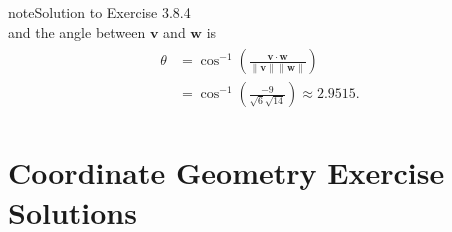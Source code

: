 \documentclass[letterpaper,10pt,english]{jupyterBook}
\begin{document}
\begin{sphinxadmonition}{note}{Solution to Exercise 3.8.4}
\begin{equation*}
\end{equation*}
\sphinxAtStartPar
and the angle between \(\mathbf{v}\) and \(\mathbf{w}\) is
\begin{equation*}
\begin{split} \begin{align*}
    \theta &= \cos^{-1} \left( \frac{\mathbf{v} \cdot \mathbf{w}}{\|\mathbf{v} \|\|\mathbf{w}\|} \right) \\
    &= \cos^{-1} \left( \frac{-9}{\sqrt{6}\sqrt{14}} \right) \approx 2.9515.
\end{align*} \end{split}
\end{equation*}\end{sphinxadmonition}

\sphinxstepscope


\chapter{Co\sphinxhyphen{}ordinate Geometry Exercise Solutions}
\label{\detokenize{_pages/A4_Coordinate_geometry_exercises_solutions:co-ordinate-geometry-exercise-solutions}}\label{\detokenize{_pages/A4_Coordinate_geometry_exercises_solutions:co-ordinate-geometry-exercises-solutions-section}}\label{\detokenize{_pages/A4_Coordinate_geometry_exercises_solutions::doc}} \label{_pages/A4_Coordinate_geometry_exercises_solutions:_pages/A4_Coordinate_geometry_exercises_solutions-solution-0}
\end{document}
